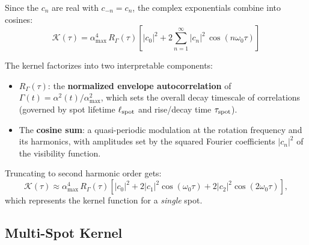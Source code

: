 \documentclass[preprint]{aastex702}
\begin{document}
Since the $c_n$ are real with $c_{-n} = c_n$, the complex exponentials combine into cosines:
\begin{equation}
    \boxed{
    \mathcal{K}(\tau) = \alpha_{\max}^4\, R_\Gamma(\tau) \left[ |c_0|^2 + 2\sum_{n=1}^{\infty} |c_n|^2\, \cos(n\omega_0\tau) \right]
    }
    \label{eq:kernel_single_spot}
\end{equation}

The kernel factorizes into two interpretable components:
\begin{itemize}[nosep]
    \item $R_\Gamma(\tau)$: the \textbf{normalized envelope autocorrelation} of $\Gamma(t) = \alpha^2(t)/\alpha_{\max}^2$, which sets the overall decay timescale of correlations (governed by spot lifetime $\ell_{\rm spot}$ and rise/decay time $\tau_{\rm spot}$).
    \item The \textbf{cosine sum}: a quasi-periodic modulation at the rotation frequency and its harmonics, with amplitudes set by the squared Fourier coefficients $|c_n|^2$ of the visibility function.
\end{itemize}

Truncating to second harmonic order gets:
\begin{equation}
    \mathcal{K}(\tau) \approx \alpha_{\max}^4\, R_\Gamma(\tau) \left[ |c_0|^2 + 2|c_1|^2\cos(\omega_0\tau) + 2|c_2|^2\cos(2\omega_0\tau) \right],
    \label{eq:kernel_truncated}
\end{equation}
which represents the kernel function for a \emph{single} spot.

\subsection{Multi-Spot Kernel} \label{subsec:multi_spot}
\end{document}
